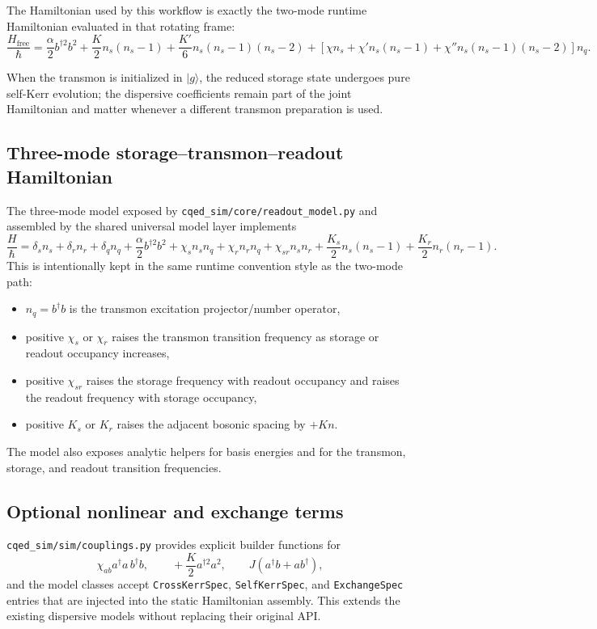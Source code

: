 \documentclass[11pt]{article}
\begin{document}
\noindent
The Hamiltonian used by this workflow is exactly the two-mode runtime Hamiltonian
evaluated in that rotating frame:
\[
\frac{H_{\mathrm{free}}}{\hbar}
=
\frac{\alpha}{2} b^{\dagger 2} b^2
+
\frac{K}{2} n_s(n_s-1)
+
\frac{K'}{6} n_s(n_s-1)(n_s-2)
+
\left[
\chi n_s
+
\chi' n_s(n_s-1)
+
\chi'' n_s(n_s-1)(n_s-2)
\right] n_q.
\]

\noindent
When the transmon is initialized in \(|g\rangle\), the reduced storage state
undergoes pure self-Kerr evolution; the dispersive coefficients remain part of
the joint Hamiltonian and matter whenever a different transmon preparation is used.

\subsection*{Three-mode storage--transmon--readout Hamiltonian}
The three-mode model exposed by \texttt{cqed\_sim/core/readout\_model.py} and
assembled by the shared universal model layer implements
\[
\frac{H}{\hbar}
=
\delta_s n_s
+
\delta_r n_r
+
\delta_q n_q
+
\frac{\alpha}{2} b^{\dagger 2} b^2
+
\chi_s n_s n_q
+
\chi_r n_r n_q
+
\chi_{sr} n_s n_r
+
\frac{K_s}{2} n_s(n_s-1)
+
\frac{K_r}{2} n_r(n_r-1).
\]
This is intentionally kept in the same runtime convention style as the two-mode path:
\begin{itemize}[leftmargin=1.5em]
  \item \(n_q=b^\dagger b\) is the transmon excitation projector/number operator,
  \item positive \(\chi_s\) or \(\chi_r\) raises the transmon transition frequency
  as storage or readout occupancy increases,
  \item positive \(\chi_{sr}\) raises the storage frequency with readout occupancy
  and raises the readout frequency with storage occupancy,
  \item positive \(K_s\) or \(K_r\) raises the adjacent bosonic spacing by \(+Kn\).
\end{itemize}

\noindent
The model also exposes analytic helpers for basis energies and for the transmon,
storage, and readout transition frequencies.

\subsection*{Optional nonlinear and exchange terms}
\texttt{cqed\_sim/sim/couplings.py} provides explicit builder functions for
\[
\chi_{ab} a^\dagger a\, b^\dagger b,\qquad
+\frac{K}{2} a^{\dagger 2} a^2,\qquad
J(a^\dagger b + a b^\dagger),
\]
and the model classes accept \texttt{CrossKerrSpec},
\texttt{SelfKerrSpec}, and \texttt{ExchangeSpec} entries that are injected into
the static Hamiltonian assembly. This extends the existing dispersive models
without replacing their original API.
\end{document}
